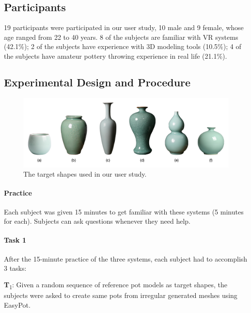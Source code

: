 \documentclass{svjour3}                     %
\begin{document}
\subsection{Participants}
\label{sec:6.2}
19 participants were participated in our user study, 10 male and 9 female, whose age ranged from 22 to 40 years. 8 of the subjects are familiar with VR systems (42.1\%); 2 of the subjects have experience with 3D modeling tools (10.5\%); 4 of the subjects have amateur pottery throwing experience in real life (21.1\%).

\subsection{Experimental Design and Procedure}
\label{sec:6.3}

\begin{figure}
\includegraphics[width=\textwidth]{target.pdf}
\caption{The target shapes used in our user study.}
\label{fig:target}
\end{figure}

\paragraph{Practice} Each subject was given 15 minutes to get familiar with these systems (5 minutes for each). Subjects can ask questions whenever they need help.

\paragraph{Task 1} After the 15-minute practice of the three systems, each subject had to accomplish 3 tasks:

\textbf{T}\textsubscript{1}: Given a random sequence of reference pot models as target shapes, the subjects were asked to create same pots from irregular generated meshes using EasyPot. 
\end{document}
